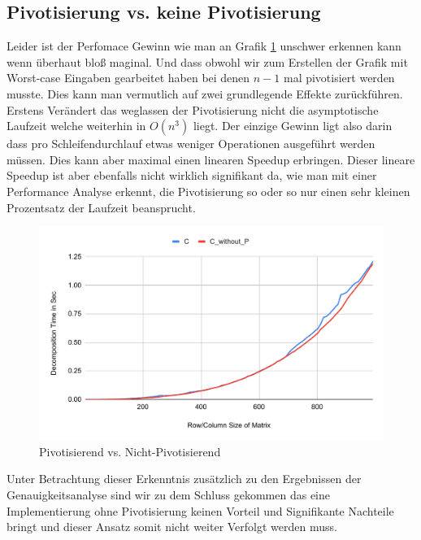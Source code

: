 \documentclass[course=erap]{aspdoc}
\begin{document}
\subsection{Pivotisierung vs. keine Pivotisierung}
Leider ist der Perfomace Gewinn wie man an Grafik \ref{PvsNP} unschwer erkennen kann wenn überhaut bloß maginal. Und dass obwohl wir zum Erstellen der Grafik mit Worst-case Eingaben gearbeitet haben bei denen $n-1$ mal pivotisiert werden musste.
Dies kann man vermutlich auf zwei grundlegende Effekte zurückführen. Erstens Verändert das weglassen der Pivotisierung nicht die
asymptotische Laufzeit welche weiterhin in $O(n^3)$ liegt. Der einzige Gewinn ligt also darin dass pro Schleifendurchlauf etwas weniger Operationen ausgeführt werden müssen. Dies kann aber maximal einen linearen Speedup erbringen. 
Dieser lineare Speedup ist aber ebenfalls nicht wirklich signifikant da, wie man mit einer Performance Analyse erkennt, die Pivotisierung so oder so nur einen sehr kleinen Prozentsatz der Laufzeit beansprucht. 
  \begin{figure}[H]
  \begin{center}
  \caption{Pivotisierend vs. Nicht-Pivotisierend} 
  \label{PvsNP}
  \includegraphics[width = 0.8\linewidth]{PvsNP.pdf}
  \end{center}
  \end{figure}
Unter Betrachtung dieser Erkenntnis zusätzlich zu den Ergebnissen der Genauigkeitsanalyse sind wir zu dem Schluss gekommen das eine Implementierung ohne Pivotisierung keinen Vorteil und Signifikante Nachteile bringt und dieser
Ansatz somit nicht weiter Verfolgt werden muss.
\end{document}
